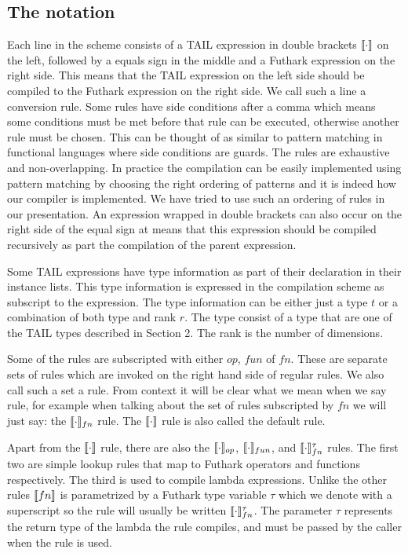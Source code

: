 \documentclass[11pt]{article}
\begin{document}
\subsection{The notation}
Each line in the scheme consists of a TAIL expression in double brackets $\llbracket \cdot \rrbracket$ on the left, followed by a
equals sign in the middle and a Futhark expression on the right side. This means that the TAIL expression on the left
side should be compiled to the Futhark expression on the right side. We call such a line a conversion rule. Some rules have side
conditions after a comma which means some conditions must be met before that rule can be executed, otherwise another
rule must be chosen. This can be thought of as similar to pattern matching in functional languages where side conditions
are guards. The rules are exhaustive and non-overlapping.
In practice the compilation can be easily implemented using pattern matching by choosing the right ordering of patterns
and it is indeed how our compiler is implemented.
We have tried to use such an ordering of rules in our presentation.
An expression wrapped in double brackets can also occur on the right side of the equal sign at means that this expression
should be compiled recursively as part the compilation of the parent expression.

Some TAIL expressions have type information as part of their declaration in their instance lists.
This type information is expressed in the compilation scheme as subscript to the expression.
The type information can be either just a type $t$ or a combination of both type and rank $r$.
The type consist of a type that are one of the TAIL types described in Section 2. The rank is the number of dimensions.

Some of the rules are subscripted with either $op$, $fun$ of $fn$.
These are separate sets of rules which are invoked on the right hand side of regular rules.
We also call such a set a rule.
From context it will be clear what we mean when we say rule, for example when talking about the set of rules subscripted by
$fn$ we will just say: the $\llbracket \cdot \rrbracket_{fn}$ rule. The $\llbracket \cdot \rrbracket$ rule is also called the default rule.

Apart from the $\llbracket \cdot \rrbracket$ rule, there are also the $\llbracket \cdot \rrbracket_{op}$, $\llbracket \cdot \rrbracket_{fun}$,  and $\llbracket \cdot \rrbracket_{fn}^{\tau}$ rules.
The first two are simple lookup rules that map to Futhark operators and functions respectively.
The third is used to compile lambda expressions.
Unlike the other rules $\llbracket fn \rrbracket$ is parametrized by a Futhark type variable $\tau$ which we denote with a superscript
so the rule will usually be written $\llbracket \cdot \rrbracket_{fn}^{\tau}$.
The parameter $\tau$ represents the return type of the lambda the rule compiles,
and must be passed by the caller when the rule is used.
\end{document}
